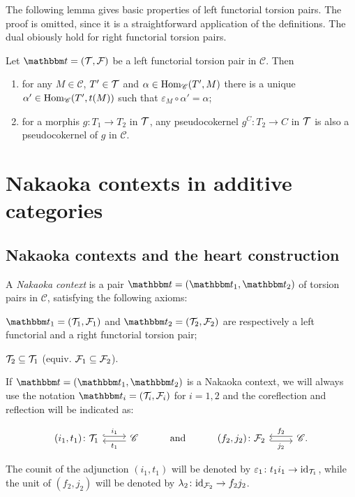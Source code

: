 The following lemma gives basic properties of left functorial torsion pairs. The proof is omitted, since it is a straightforward application of the definitions. The dual obiously hold for right functorial torsion pairs.

\begin{lemma}\label{rmk:1.1}
  Let $\t=(\T,\F)$ be a left functorial torsion pair in $\mathscr{C}$. Then
\begin{enumerate}[label=(\alph*)]
\item\label{rmk:1.1a} for any $M\in\mathscr{C}$, $T'\in\mathcal{T}$ and $\alpha\in\operatorname{Hom}_\mathscr{C}(T',M)$ there is a unique $\alpha'\in\operatorname{Hom}_\mathscr{C}(T',t(M))$ such that $\varepsilon_M\circ\alpha'=\alpha$;

\item\label{rmk:1.1b} for a morphis $g:T_1\to T_2$ in $\mathcal{T}$, any pseudocokernel $g^C:T_2\to C$ in $\mathcal{T}$ is also a pseudocokernel of $g$ in $\mathscr{C}$.
\end{enumerate}
\end{lemma}

\section{Nakaoka contexts in additive categories}
\subsection{Nakaoka contexts and the heart construction}

\begin{definition}
  A \emph{Nakaoka context} is a pair $\t=(\t_1,\t_2)$ of torsion pairs in $\mathscr{C}$, satisfying the following axioms:
  \begin{torsionaxioms}
    \item\label{ax:ct1} $\t_1=(\T_1,\F_1)$ and $\t_2=(\T_2,\F_2)$ are respectively a left functorial and a right functorial torsion pair;
    \item\label{ax:ct2} $\mathcal{T}_2\subseteq \mathcal{T}_1$ (equiv. $\mathcal{F}_1\subseteq\mathcal{F}_2$).
  \end{torsionaxioms}
\end {definition}

\begin{notation}
  If $\t=(\t_1,\t_2)$ is a Nakaoka context, we will always use the notation $\t_i = (\T_i,\F_i)$ for $i=1,2$ and the coreflection and reflection will be indicated as:

\begin{equation*}
\begin{tikzcd}
(i_1,t_1)\colon\T_1\arrow[hook, shift left]{r}{i_1}
& \mathscr{C}\arrow[shift left]{l}{t_1}
& \mathrm{and}
& (f_2,j_2)\colon\F_2\arrow[hook, shift right]{r}[']{j_2}
& \mathscr{C}\arrow[shift right]{l}[']{f_2}.
\end{tikzcd}
\end{equation*}

The counit of the adjunction $(i_1,t_1)$ will be denoted by $\varepsilon_1\colon t_1i_1\to \mathrm{id}_{\mathcal{T}_1}$, while the unit of $(f_2,j_2)$ will be denoted by $\lambda_2\colon \mathrm{id}_{\mathcal{F}_2}\to f_2j_2$.
\end{notation}

